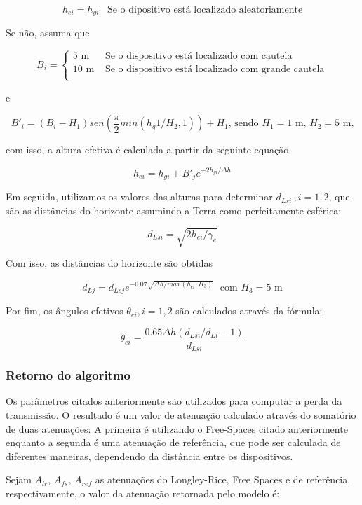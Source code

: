 \[
h_{ei} = h_{gi} \,\,\,\,\, \text{Se o dipositivo está localizado aleatoriamente}
\]

Se não, assuma que

\[ B_i = \begin{cases} 
      5 \text{ m} & \textrm{ Se o dispositivo está localizado com cautela} \\
      10 \text{ m} & \textrm{ Se o dispositivo está localizado com grande cautela} \\
   \end{cases} \]  
   
e

\[ B'_i = (B_i - H_1)sen(\frac{\pi}{2} min(h_g1/H_2,1)) + H_1 \textrm{, sendo $H_1 = 1$ m, $H_2 = 5$ m,} \]

com isso, a altura efetiva é calculada a partir da seguinte equação

\[ h_{ei} = h_{gi} + B'_je^{-2h_{gi}/\Delta h} \]

Em seguida, utilizamos os valores das alturas para determinar $d_{Lsi}\, , i=1,2$, que são as distâncias do horizonte assumindo a Terra como perfeitamente esférica:

\[
d_{Lsi} = \sqrt{2h_{ei}/\gamma_e}
\]

Com isso, as distâncias do horizonte são obtidas

\[
d_{Lj} = d_{Lsj}e^{-0.07\sqrt{\Delta h / max(h_{ei},H_3)}} \,\,\,\, \text{com $H_3 = 5$ m}
\]

Por fim, os ângulos efetivos $\theta_{ei}, i=1,2$ são calculados através da fórmula:

\[
	\theta_{ei} = \frac{0.65\Delta h(d_{Lsi}/d_{Li} -1)}{d_{Lsi}}
\]


\subsubsection{Retorno do algoritmo}

Os parâmetros citados anteriormente são utilizados para computar a perda da transmissão. O resultado é um valor de atenuação calculado através do somatório de duas atenuações: A primeira é utilizando o Free-Spaces citado anteriormente enquanto a segunda é uma atenuação de referência, que pode ser calculada de diferentes maneiras, dependendo da distância entre os dispositivos.

Sejam $A_{lr}$, $A_{fs}$, $A_{ref}$ as atenuações do Longley-Rice, Free Spaces e de referência, respectivamente, o valor da atenuação retornada pelo modelo é:

